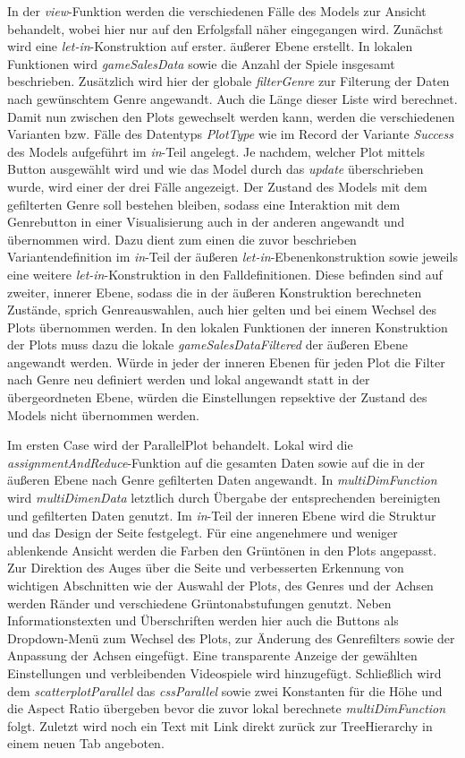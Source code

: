 \documentclass[usegeometry=true]{scrartcl}
\begin{document}
In der \textit{view}-Funktion werden die verschiedenen Fälle des Models zur Ansicht behandelt, wobei hier nur auf den Erfolgsfall näher eingegangen wird. 
Zunächst wird eine \textit{let-in}-Konstruktion auf erster. äußerer Ebene erstellt. 
In lokalen Funktionen wird \textit{gameSalesData} sowie die Anzahl der Spiele insgesamt beschrieben.
Zusätzlich wird hier der globale \textit{filterGenre} zur Filterung der Daten nach gewünschtem Genre angewandt.
Auch die Länge dieser Liste wird berechnet. 
Damit nun zwischen den Plots gewechselt werden kann, werden die verschiedenen Varianten bzw. Fälle des Datentyps \textit{PlotType} wie im Record der Variante \textit{Success} des Models aufgeführt im \textit{in}-Teil angelegt. 
Je nachdem, welcher Plot mittels Button ausgewählt wird und wie das Model durch das \textit{update} überschrieben wurde, wird einer der drei Fälle angezeigt. 
Der Zustand des Models mit dem gefilterten Genre soll bestehen bleiben, sodass eine Interaktion mit dem Genrebutton in einer Visualisierung auch in der anderen angewandt und übernommen wird.
Dazu dient zum einen die zuvor beschrieben Variantendefinition im \textit{in}-Teil der äußeren \textit{let-in}-Ebenenkonstruktion sowie jeweils eine weitere \textit{let-in}-Konstruktion in den Falldefinitionen.
Diese befinden sind auf zweiter, innerer Ebene, sodass die in der äußeren Konstruktion berechneten Zustände, sprich Genreauswahlen, auch hier gelten und bei einem Wechsel des Plots übernommen werden. 
In den lokalen Funktionen der inneren Konstruktion der Plots muss dazu die lokale \textit{gameSalesDataFiltered} der äußeren Ebene angewandt werden. 
Würde in jeder der inneren Ebenen für jeden Plot die Filter nach Genre neu definiert werden und lokal angewandt statt in der übergeordneten Ebene, würden die Einstellungen repsektive der Zustand des Models nicht übernommen werden.

Im ersten Case wird der ParallelPlot behandelt. 
Lokal wird die \textit{assignmentAndReduce}-Funktion auf die gesamten Daten sowie auf die in der äußeren Ebene nach Genre gefilterten Daten angewandt.
In \textit{multiDimFunction} wird \textit{multiDimenData} letztlich durch Übergabe der entsprechenden bereinigten und gefilterten Daten genutzt. 
Im \textit{in}-Teil der inneren Ebene wird die Struktur und das Design der Seite festgelegt.
Für eine angenehmere und weniger ablenkende Ansicht werden die Farben den Grüntönen in den Plots angepasst. 
Zur Direktion des Auges über die Seite und verbesserten Erkennung von wichtigen Abschnitten wie der Auswahl der Plots, des Genres und der Achsen werden Ränder und verschiedene Grüntonabstufungen genutzt.
Neben Informationstexten und Überschriften werden hier auch die Buttons als Dropdown-Menü zum Wechsel des Plots, zur Änderung des Genrefilters sowie der Anpassung der Achsen eingefügt.
Eine transparente Anzeige der gewählten Einstellungen und verbleibenden Videospiele wird hinzugefügt.
Schließlich wird dem \textit{scatterplotParallel} das \textit{cssParallel} sowie zwei Konstanten für die Höhe und die Aspect Ratio übergeben bevor die zuvor lokal berechnete \textit{multiDimFunction} folgt. 
Zuletzt wird noch ein Text mit Link direkt zurück zur TreeHierarchy in einem neuen Tab angeboten.
\end{document}
